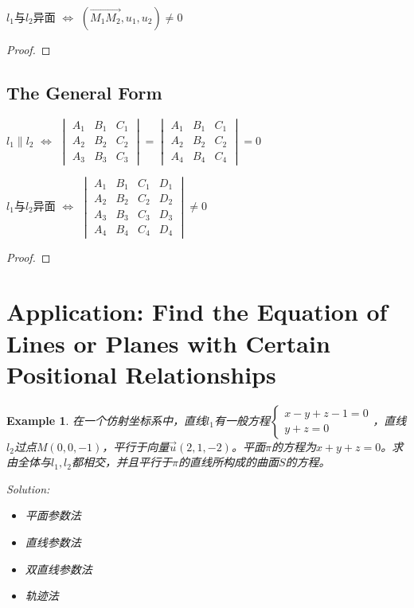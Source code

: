 \documentclass[onecolumn]{ctexart}
\newtheorem{example}{Example}
\begin{document}
$l_1$与$l_2$异面 $\Leftrightarrow$ $(\vec{M_1M_2}, u_1, u_2) \neq 0$

\begin{proof}
  
\end{proof}

\subsection{The General Form}

$l_1 \parallel l_2$ $\Leftrightarrow$ $
\begin{vmatrix}
  A_1 & B_1 & C_1 \\
  A_2 & B_2 & C_2 \\
  A_3 & B_3 & C_3 
\end{vmatrix} = 
\begin{vmatrix}
  A_1 & B_1 & C_1 \\
  A_2 & B_2 & C_2 \\
  A_4 & B_4 & C_4  
\end{vmatrix} = 0$

$l_1$与$l_2$异面 $\Leftrightarrow$ $
\begin{vmatrix}
  A_1 & B_1 & C_1 & D_1 \\
  A_2 & B_2 & C_2 & D_2 \\
  A_3 & B_3 & C_3 & D_3 \\
  A_4 & B_4 & C_4 & D_4
\end{vmatrix} \neq 0$

\begin{proof}
  
\end{proof}

\section{Application: Find the Equation of Lines or Planes with Certain Positional Relationships}

\begin{example}
  在一个仿射坐标系中，直线$l_1$有一般方程$
  \begin{cases}
    x - y + z - 1 = 0 \\
    y + z = 0
  \end{cases}$，直线$l_2$过点$M(0, 0, -1)$，平行于向量$\vec{u}(2, 1, -2)$。平面$\pi$的方程为$x + 
  y + z = 0$。求由全体与$l_1, l_2$都相交，并且平行于$\pi$的直线所构成的曲面$S$的方程。

  Solution:
  \begin{itemize}
    \item 平面参数法
    \item 直线参数法
    \item 双直线参数法
    \item 轨迹法
  \end{itemize}
\end{example}
\end{document}
